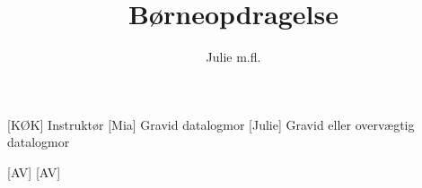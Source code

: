 \documentclass[a4paper,11pt]{article}
\title{Børneopdragelse}
\author{Julie m.fl.}
\begin{document}
\maketitle

\begin{roles}
    [KØK] Instruktør
    [Mia] Gravid datalogmor
    [Julie] Gravid eller overvægtig datalogmor
\end{roles}

\begin{props}
  [AV]
  [AV]
\end{props}

\begin{sketch}



\end{sketch}
\end{document}
